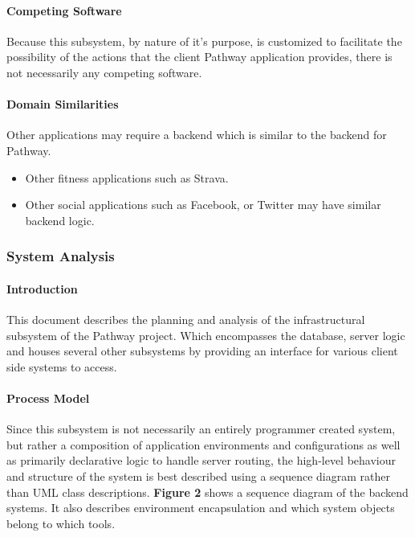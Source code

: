 ﻿\documentclass{article}
\begin{document}
\paragraph{Competing Software}
Because this subsystem, by nature of it's purpose, is customized to facilitate the possibility of the actions that the client Pathway
application provides, there is not necessarily any competing software.

\paragraph{Domain Similarities}
Other applications may require a backend which is similar to the backend for Pathway. 
\begin{itemize}
    \item Other fitness applications such as Strava.
    \item Other social applications such as Facebook, or Twitter may have similar backend logic.
\end{itemize}

\subsubsection{System Analysis}
\paragraph{Introduction}
This document describes the planning and analysis of the infrastructural subsystem of the 
Pathway project. Which encompasses the database, server logic and houses several other subsystems
by providing an interface for various client side systems to access.

\paragraph{Process Model}
Since this subsystem is not necessarily an entirely programmer created system, but rather a
composition of application environments and configurations as well as primarily declarative 
logic to handle server routing, the high-level behaviour and structure of the system is best 
described using a sequence diagram rather than UML class descriptions. \textbf{Figure 2} shows
a sequence diagram of the backend systems. It also describes environment encapsulation and which
system objects belong to which tools.
\end{document}

